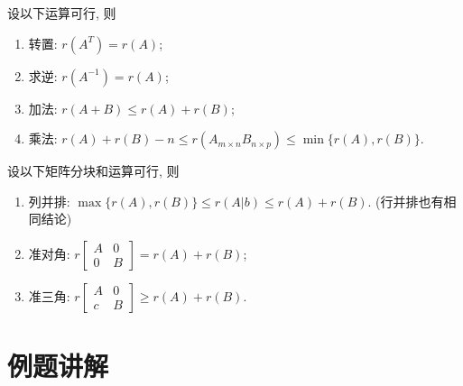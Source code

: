\begin{thm}
设以下运算可行, 则
\begin{enumerate}
\item 转置: $r(A^T)=r(A)$;
\item 求逆: $r(A^{-1})=r(A)$;
\item 加法: $r(A+B)\leq r(A)+r(B);$
\item 乘法: $r(A)+r(B)-n\leq r(A_{m\times n}B_{n\times p })\leq \min \{r(A),r(B)\}$.

\end{enumerate}

\end{thm}

\begin{thm}
设以下矩阵分块和运算可行, 则
\begin{enumerate}
\item 列并排: $\max\{r(A),r(B)\}\leq r(A|b)\leq  r(A)+r(B)$. (行并排也有相同结论)
\item 准对角: $r\begin{bmatrix} A&0\\0&B\end{bmatrix}=r(A)+r(B)$;
\item 准三角: $r\begin{bmatrix} A&0\\c&B\end{bmatrix}\geq r(A)+r(B)$.
\end{enumerate}
\end{thm}


\section{例题讲解}

